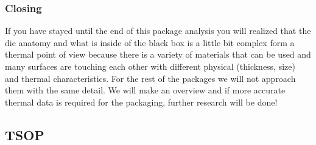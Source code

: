 \documentclass[final]{cubedoc}
\begin{document}


\subsubsection{Closing}


If you have stayed until the end of this package analysis you will realized that the die anatomy and what is inside of the black box is a little bit complex form a thermal point of view because there is a variety of materials that can be used and many surfaces are touching each other with different physical (thickness, size) and thermal characteristics. For the rest of the packages we will not approach them with the same detail. We will make an overview and if more accurate thermal data is required for the packaging, further research will be done!





\subsection{TSOP}
\end{document}
